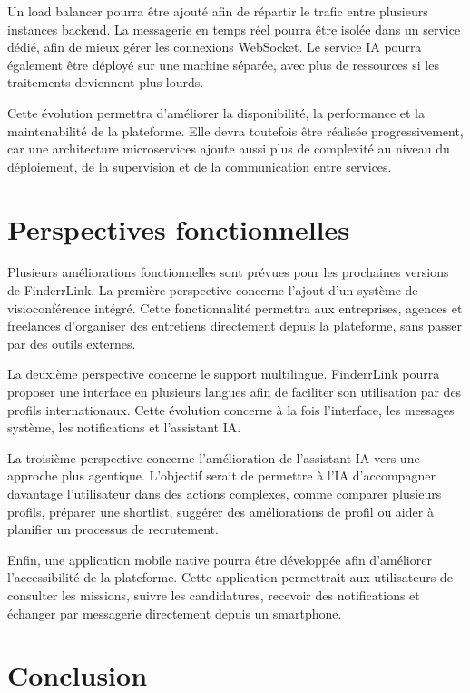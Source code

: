 Un load balancer pourra être ajouté afin de répartir le trafic entre plusieurs instances backend. La messagerie en temps réel pourra être isolée dans un service dédié, afin de mieux gérer les connexions WebSocket. Le service IA pourra également être déployé sur une machine séparée, avec plus de ressources si les traitements deviennent plus lourds.

Cette évolution permettra d'améliorer la disponibilité, la performance et la maintenabilité de la plateforme. Elle devra toutefois être réalisée progressivement, car une architecture microservices ajoute aussi plus de complexité au niveau du déploiement, de la supervision et de la communication entre services.

\section{Perspectives fonctionnelles}

Plusieurs améliorations fonctionnelles sont prévues pour les prochaines versions de FinderrLink. La première perspective concerne l'ajout d'un système de visioconférence intégré. Cette fonctionnalité permettra aux entreprises, agences et freelances d'organiser des entretiens directement depuis la plateforme, sans passer par des outils externes.

La deuxième perspective concerne le support multilingue. FinderrLink pourra proposer une interface en plusieurs langues afin de faciliter son utilisation par des profils internationaux. Cette évolution concerne à la fois l'interface, les messages système, les notifications et l'assistant IA.

La troisième perspective concerne l'amélioration de l'assistant IA vers une approche plus agentique. L'objectif serait de permettre à l'IA d'accompagner davantage l'utilisateur dans des actions complexes, comme comparer plusieurs profils, préparer une shortlist, suggérer des améliorations de profil ou aider à planifier un processus de recrutement.

Enfin, une application mobile native pourra être développée afin d'améliorer l'accessibilité de la plateforme. Cette application permettrait aux utilisateurs de consulter les missions, suivre les candidatures, recevoir des notifications et échanger par messagerie directement depuis un smartphone.

\section{Conclusion}

